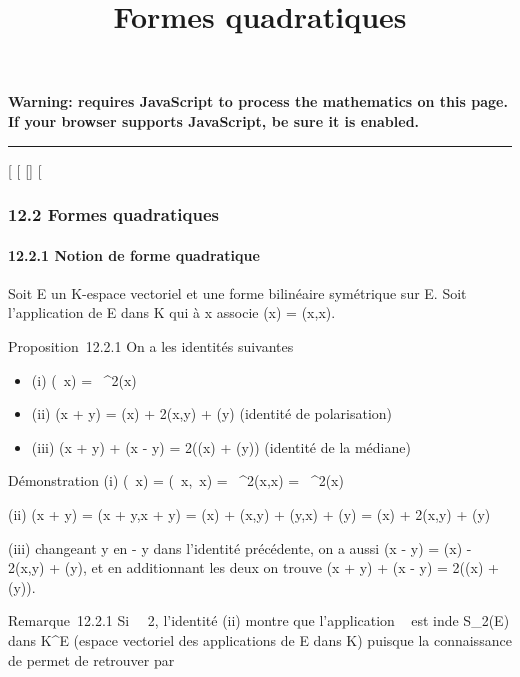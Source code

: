 \documentclass[]{article}
\title{Formes quadratiques}
\author{}
\date{}
\begin{document}
\maketitle

\textbf{Warning: 
requires JavaScript to process the mathematics on this page.\\ If your
browser supports JavaScript, be sure it is enabled.}

\begin{center}\rule{3in}{0.4pt}\end{center}

{[}
{[}
{[}{]}
{[}

\subsubsection{12.2 Formes quadratiques}

\paragraph{12.2.1 Notion de forme quadratique}

Soit E un K-espace vectoriel et \phi une forme bilinéaire symétrique sur E.
Soit \Phi l'application de E dans K qui à x associe \Phi(x) = \phi(x,x).

Proposition~12.2.1 On a les identités suivantes

\begin{itemize}
\itemsep1pt\parskip0pt
\item
  (i) \Phi(\lambda~x) = \lambda~^2\Phi(x)
\item
  (ii) \Phi(x + y) = \Phi(x) + 2\phi(x,y) + \Phi(y) (identité de polarisation)
\item
  (iii) \Phi(x + y) + \Phi(x - y) = 2(\Phi(x) + \Phi(y)) (identité de la médiane)
\end{itemize}

Démonstration (i) \Phi(\lambda~x) = \phi(\lambda~x,\lambda~x) = \lambda~^2\phi(x,x) =
\lambda~^2\Phi(x)

(ii) \Phi(x + y) = \phi(x + y,x + y) = \Phi(x) + \phi(x,y) + \phi(y,x) + \Phi(y) = \Phi(x) +
2\phi(x,y) + \Phi(y)

(iii) changeant y en - y dans l'identité précédente, on a aussi \Phi(x - y)
= \Phi(x) - 2\phi(x,y) + \Phi(y), et en additionnant les deux on trouve \Phi(x + y)
+ \Phi(x - y) = 2(\Phi(x) + \Phi(y)).

Remarque~12.2.1 Si
\mathrmcarK\mathrel\neq~~2,
l'identité (ii) montre que l'application \phi\mapsto~\Phi
est in\jmathective de S\_2(E) dans K^E (espace vectoriel
des applications de E dans K) puisque la connaissance de \Phi permet de
retrouver \phi par
\end{document}
